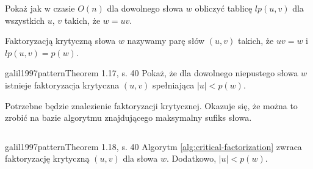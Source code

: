 \begin{problem}{}{}
  Pokaż jak w czasie $O(n)$ dla dowolnego słowa $w$ obliczyć tablicę $lp(u, v)$ dla wszystkich $u$, $v$ takich, że $w = uv$.
\end{problem}

\begin{definition}{}{}
  Faktoryzacją krytyczną słowa $w$ nazywamy parę słów $(u, v)$ takich, że $uv = w$ i $lp(u, v) = p(w)$.
\end{definition}

\begin{problem}{galil1997pattern}{Theorem 1.17, s. 40}
  Pokaż, że dla dowolnego niepustego słowa $w$ istnieje faktoryzacja krytyczna $(u, v)$ spełniająca $|u| < p(w)$.
\end{problem}

Potrzebne będzie znalezienie faktoryzacji krytycznej. Okazuje się, że można to zrobić na bazie algorytmu znajdującego maksymalny sufiks słowa.

\begin{code}
\inputminted{python}{code/factorization/critical-factorization.py}
\label{alg:critical-factorization}
\end{code}

\begin{theorem}{galil1997pattern}{Theorem 1.18, s. 40}
  Algorytm \ref{alg:critical-factorization} zwraca faktoryzację krytyczną $(u, v)$ dla słowa $w$. Dodatkowo, $|u| < p(w)$.
\end{theorem}

